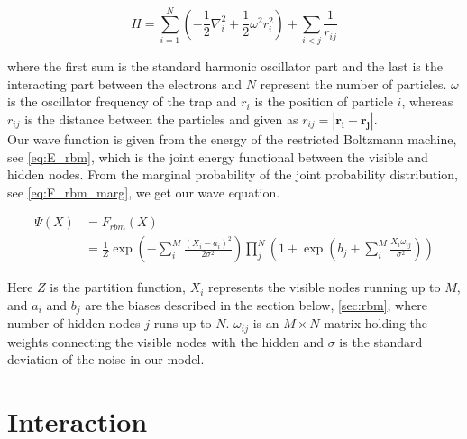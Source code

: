 \begin{equation}\label{eq:hamilt}
\hat{H} = \sum_{i=1}^N \left( - \frac{1}{2} \nabla_i^2 + \frac{1}{2} \omega^2 r_i^2 \right) + \sum_{i<j} \frac{1}{r_{ij}}
\end{equation}

where the first sum is the standard harmonic oscillator part and the last is the interacting part between the electrons and $N$ represent the number of particles. $\omega$ is the oscillator frequency of the trap and $r_i$ is the position of particle $i$, whereas $r_{ij}$ is the distance between the particles and given as $r_{ij} = |\mathbf{r_i} - \mathbf{r_j}|$. \\
Our wave function is given from the energy of the restricted Boltzmann machine, see \eqref{eq:E_rbm}, which is the joint energy functional between the visible and hidden nodes. From the marginal probability of the joint probability distribution, see \eqref{eq:F_rbm_marg}, we get our wave equation.                     

\begin{align}\label{eq:F_rbm}
\Psi(X) &= F_{rbm}(X) \\
&= \frac{1}{Z} \exp \left( -\sum_{i}^{M} \frac{(X_i - a_i)^2}{2 \sigma^2} \right) \prod_{j}^{N} \left( 1 + \exp \left( b_j + \sum_{i}^{M} \frac{X_i \omega_{ij}}{\sigma^2} \right) \right)
\end{align}

Here $Z$ is the partition function, $X_i$ represents the visible nodes running up to $M$, and $a_i$ and $b_j$ are the biases described in the section below, \eqref{sec:rbm}, where number of hidden nodes $j$ runs up to $N$. 
$\omega_{ij}$ is an $M \times N$ matrix holding the weights connecting the visible nodes with the hidden and $\sigma$ is the standard deviation of the noise in our model. \\

\section{Interaction}